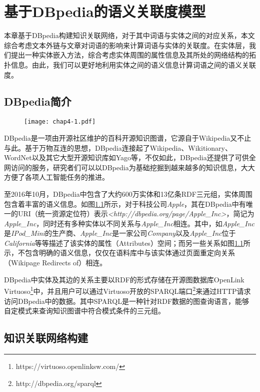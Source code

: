 \chapter{基于DBpedia的语义关联度模型}
\label{chap:chap04}

本章基于DBpedia构建知识关联网络，对于其中词语与实体之间的对应关系，本文综合考虑文本外链与文章对词语的影响来计算词语与实体的关联度。在实体层，我们提出一种实体嵌入方法，综合考虑实体周围的属性信息及其所处的网络结构的拓扑信息。由此，我们可以更好地利用实体之间的语义信息计算词语之间的语义关联度。

\section{DBpedia简介}

\begin{figure}[!ht]
    \centerline{\texttt{[image: chap4-1.pdf]}}
    \label{chap4-1}
\end{figure}

DBpedia是一项由开源社区维护的百科开源知识图谱，它源自于Wikipedia又不止与此。基于万物互连的思想，DBpedia连接起了Wikipedia、Wikitionary、WordNet以及其它大型开源知识库如Yago等，不仅如此，DBpedia还提供了可供全网访问的服务，研究者们可以以DBpedia为基础挖掘到越来越多的知识信息，大大方便了各项人工智能任务的推进。

至2016年10月，DBpedia中包含了大约600万实体和13亿条RDF三元组，实体周围包含着丰富的语义信息。如图\ref{chap4-1}所示，对于科技公司\emph{Apple}，其在DBpedia中有唯一的URI（统一资源定位符）表示\emph{<http://dbpedia.org/page/Apple\_Inc>}，简记为\emph{Apple\_Inc}，同时还有多种实体以不同关系与\emph{Apple\_Inc}相连。其中，如\emph{Apple\_Inc}是\emph{IPod\_Mini}的生产商、\emph{Apple\_Inc}是一家公司\emph{Company}以及\emph{Apple\_Inc}位于\emph{California}等等描述了该实体的属性（Attributes）空间；而另一些关系如图\ref{chap4-1}所示，不包含明确的语义信息，仅仅在语料库中与该实体通过页面重定向关系（Wikipage Redirects of）相连。

DBpedia中实体及其边的关系主要以RDF的形式存储在开源图数据库OpenLink Virtuoso\footnote{https://virtuoso.openlinksw.com/}中，并且用户可以通过Virtuoso开放的SPARQL端口\footnote{http://dbpedia.org/sparql}来通过HTTP请求访问DBpedia中的数据。其中SPARQL是一种针对RDF数据的图查询语言，能够自定模式来查询知识图谱中符合模式条件的三元组。


\section{知识关联网络构建}

